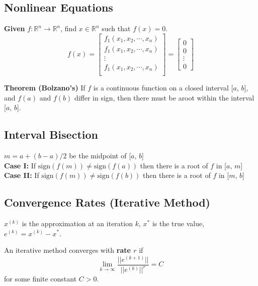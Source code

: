 \documentclass[9pt]{article}
\begin{document}
\begin{multicols}{3}
\section{Nonlinear Equations}
\textbf{Given} $f: \mathbb{R}^n \rightarrow \mathbb{R}^n$, find $x \in \mathbb{R}^n$ such that $f(x) = 0$.
\[
f(x) = 
\begin{bmatrix}
    f_1(x_1, x_2, \cdots, x_n)\\
    f_1(x_1, x_2, \cdots, x_n)\\
    \vdots\\
    f_1(x_1, x_2, \cdots, x_n)\\
\end{bmatrix}
=
\begin{bmatrix}
    0\\
    0\\
    \vdots\\
    0
\end{bmatrix}
\]

\textbf{Theorem (Bolzano's)} If $f$ is a continuous function on a closed interval [$a$, $b$], and $f(a)$ and $f(b)$ differ in sign, then there must be aroot within the interval [$a$, $b$].

\hdashrule{\linewidth}{0.5pt}{1mm 1mm}
\vspace{-0.65cm}

\subsection*{Interval Bisection}    
$m = a + (b-a)/2$ be the midpoint of [$a$, $b$]\\

\textbf{Case I: }If $\text{sign}(f(m)) \neq \text{sign}(f(a))$ then there is a root of $f$ in [$a$, $m$] \\
\textbf{Case II: }If $\text{sign}(f(m)) \neq \text{sign}(f(b))$ then there is a root of $f$ in [$m$, $b$]

\hdashrule{\linewidth}{0.5pt}{1mm 1mm}
\vspace{-0.65cm}
\subsection*{\small{Convergence Rates (Iterative Method)}}
$x^{(k)}$ is the approximation at an iteration $k$, $x^*$ is the true value, $e^{(k)} = x^{(k)} - x^*$.

An iterative method converges with \textbf{rate $r$} if 
\[
\lim_{k \rightarrow \infty} \frac{||e^{(k+1)}||}{||e^{(k)}||^r} = C
\]
for some finite constant $C > 0$.


\end{multicols}
\end{document}
